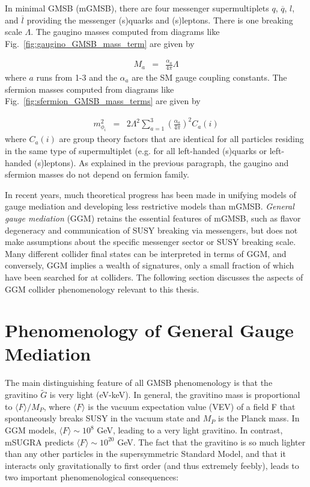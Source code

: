 \documentclass[dissertation.tex]{subfiles}
\begin{document}
In minimal GMSB (mGMSB), there are four messenger supermultiplets $q$, $\overline{q}$, $l$, and $\overline{l}$ providing the messenger (s)quarks and (s)leptons.  There is one breaking scale $\Lambda$.  The gaugino masses computed from diagrams like Fig.~\ref{fig:gaugino_GMSB_mass_term} are given by

\begin{eqnarray}
\label{eq:m_gaugino}
M_{a} &=& \frac{\alpha_{a}}{4\pi}\Lambda
\end{eqnarray}
%
where $a$ runs from 1-3 and the $\alpha_{a}$ are the SM gauge coupling constants.  The sfermion masses computed from diagrams like Fig.~\ref{fig:sfermion_GMSB_mass_terms} are given by

\begin{eqnarray}
\label{eq:m_sfermion}
m_{\phi_{i}}^{2} &=& 2\Lambda^{2}\sum_{a=1}^{3}(\frac{\alpha_{a}}{4\pi})^{2}C_{a}(i)
\end{eqnarray}
%
where $C_{a}(i)$ are group theory factors that are identical for all particles residing in the same type of supermultiplet (e.g. for all left-handed (s)quarks or left-handed (s)leptons).  As explained in the previous paragraph, the gaugino and sfermion masses do not depend on fermion family.

In recent years, much theoretical progress has been made in unifying models of gauge mediation and developing less restrictive models than mGMSB.  \textit{General gauge mediation} (GGM)\cite{Meade_Seiberg_and_Shih} retains the essential features of mGMSB, such as flavor degeneracy and communication of SUSY breaking via messengers, but does not make assumptions about the specific messenger sector or SUSY breaking scale.  Many different collider final states can be interpreted in terms of GGM, and conversely, GGM implies a wealth of signatures, only a small fraction of which have been searched for at colliders\cite{ATLAS_GMSB_1fb-1, CDF_2010_GMSB_paper, CMS_GMSB_1fb-1}.  The following section discusses the aspects of GGM collider phenomenology relevant to this thesis.

\section{Phenomenology of General Gauge Mediation}
\label{sec:Phenomenology of General Gauge Mediation}

The main distinguishing feature of all GMSB phenomenology is that the gravitino $\widetilde{G}$ is very light (eV-keV).  In general, the gravitino mass is proportional to $\langle F\rangle/M_{P}$, where $\langle F\rangle$ is the vacuum expectation value (VEV) of a field F that spontaneously breaks SUSY in the vacuum state and $M_{P}$ is the Planck mass.  In GGM models, $\langle F\rangle \sim 10^{8}$ GeV, leading to a very light gravitino.  In contrast, mSUGRA predicts $\langle F\rangle \sim 10^{20}$ GeV.  The fact that the gravitino is so much lighter than any other particles in the supersymmetric Standard Model, and that it interacts only gravitationally to first order (and thus extremely feebly), leads to two important phenomenological consequences:
\end{document}
